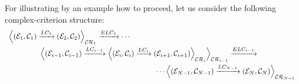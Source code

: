 \documentclass[a4paper,11pt] {article}
\begin{document}
For illustrating by an example how to proceed, let us consider the following complex-criterion structure:
\begin{equation}\label{eq-CriterionStructure03}
\begin{array}{l}
\displaystyle \Big \langle (\mathcal E_1, \mathcal C_1) \xrightarrow{LC_1} 
(\mathcal E_2, \mathcal C_2) \Big \rangle_{\mathcal{CR}_1 } \xrightarrow{ELC_1} 
\cdots \vspace{1mm}
\\
\hspace{1.5cm} \displaystyle \Big \langle (\mathcal E_{i-1}, \mathcal C_{i-1}) \xrightarrow{LC_{i-1}}
\Big \langle
(\mathcal E_i, \mathcal C_i) \xrightarrow{LC_i}
(\mathcal E_{i+1}, \mathcal C_{i+1}) \Big\rangle_{\mathcal{CR}_{i} }  \Big \rangle_{\mathcal{CR}_{i-1}}  \xrightarrow{ELC_{i-1}}  \vspace{1mm} \\
 \hspace{7cm} \cdots \displaystyle \Big \langle (\mathcal E_{N-1}, \mathcal C_{N-1}) \xrightarrow{LC_{N-1}}
(\mathcal E_N, \mathcal C_N) \Big\rangle_{\mathcal{CR}_{N-1} } \\
\end{array}
\end{equation}
\end{document}
